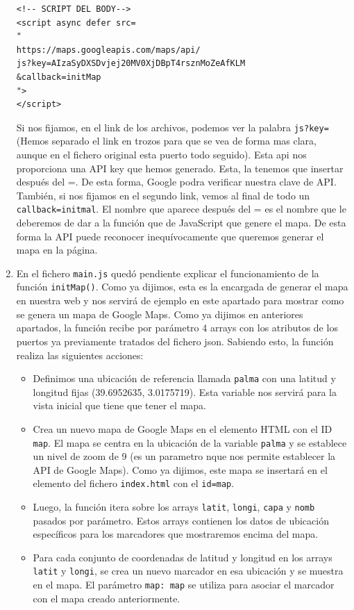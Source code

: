 \documentclass{article}
\begin{document}
\begin{enumerate}
\begin{verbatim}
<!-- SCRIPT DEL BODY-->
<script async defer src=
"
https://maps.googleapis.com/maps/api/
js?key=AIzaSyDXSDvjej20MV0XjDBpT4rsznMoZeAfKLM
&callback=initMap
">
</script>
    \end{verbatim}
    Si nos fijamos, en el link de los archivos, podemos ver la palabra \texttt{js?key=} (Hemos separado el link en trozos para que se vea de forma mas clara, aunque en el fichero original esta puerto todo seguido). Esta api nos proporciona una API key que hemos generado. Esta, la tenemos que insertar después del =. De esta forma, Google podra verificar nuestra clave de API. También, si nos fijamos en el segundo link, vemos al final de todo un \texttt{callback=initmal}. El nombre que aparece después del = es el nombre que le deberemos de dar a la función que de JavaScript que genere el mapa. De esta forma la API puede reconocer inequívocamente que queremos generar el mapa en la página.
    \item  En el fichero \texttt{main.js} quedó pendiente explicar el funcionamiento de la función \texttt{initMap()}. Como ya dijimos, esta es la encargada de generar el mapa en nuestra web y nos servirá de ejemplo en este apartado para mostrar como se genera un mapa de Google Maps. Como ya dijimos en anteriores apartados, la función recibe por parámetro 4 arrays con los atributos de los puertos ya previamente tratados del fichero json. Sabiendo esto, la función realiza las siguientes acciones:
    \begin{itemize}
        \item Definimos una ubicación de referencia llamada \texttt{palma} con una latitud y longitud fijas (39.6952635, 3.0175719). Esta variable nos servirá para la vista inicial que tiene que tener el mapa.
        \item Crea un nuevo mapa de Google Maps en el elemento HTML con el ID \texttt{map}. El mapa se centra en la ubicación de la variable \texttt{palma} y se establece un nivel de zoom de 9 (es un parametro nque nos permite establecer la API de Google Maps). Como ya dijimos, este mapa se insertará en el elemento del fichero \texttt{index.html} con el \texttt{id=map}.
        \item Luego, la función itera sobre los arrays \texttt{latit}, \texttt{longi}, \texttt{capa} y \texttt{nomb} pasados por parámetro. Estos arrays contienen los datos de ubicación específicos para los marcadores que mostraremos encima del mapa.
        \item Para cada conjunto de coordenadas de latitud y longitud en los arrays \texttt{latit} y \texttt{longi}, se crea un nuevo marcador en esa ubicación y se muestra en el mapa. El parámetro \texttt{map: map} se utiliza para asociar el marcador con el mapa creado anteriormente.

\end{itemize}
\end{enumerate}
\end{document}
